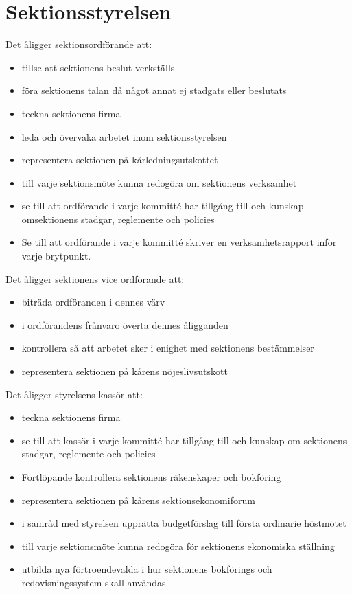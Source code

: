 \documentclass[a4paper]{dteklag}
\begin{document}
\section{Sektionsstyrelsen}
\para Det åligger sektionsordförande att:
\begin{itemize}
  \item tillse att sektionens beslut verkställs
  \item föra sektionens talan då något annat ej stadgats eller beslutats
  \item teckna sektionens firma
  \item leda och övervaka arbetet inom sektionsstyrelsen
  \item representera sektionen på kårledningsutskottet
  \item till varje sektionsmöte kunna redogöra om sektionens verksamhet
  \item se till att ordförande i varje kommitté har tillgång till och kunskap omsektionens stadgar, reglemente och policies
  \item Se till att ordförande i varje kommitté skriver en verksamhetsrapport inför varje brytpunkt.
\end{itemize}
\para Det åligger sektionens vice ordförande att:
\begin{itemize}
  \item biträda ordföranden i dennes värv
  \item i ordförandens frånvaro överta dennes åligganden
  \item kontrollera så att arbetet sker i enighet med sektionens bestämmelser
  \item representera sektionen på kårens nöjeslivsutskott
\end{itemize}
\para Det åligger styrelsens kassör att:
\begin{itemize}
  \item teckna sektionens firma
  \item se till att kassör i varje kommitté har tillgång till och kunskap om sektionens stadgar, reglemente och policies
  \item Fortlöpande kontrollera sektionens räkenskaper och bokföring
  \item representera sektionen på kårens sektionsekonomiforum
  \item i samråd med styrelsen upprätta budgetförslag till första ordinarie höstmötet
  \item till varje sektionsmöte kunna redogöra för sektionens ekonomiska ställning
  \item utbilda nya förtroendevalda i hur sektionens bokförings och redovisningssystem skall användas
\end{itemize}
\end{document}
